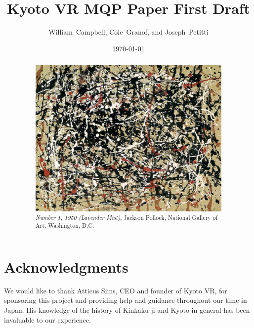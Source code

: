 \documentclass[a4paper, 10pt, american, titlepage]{article}
\title{Kyoto VR MQP Paper First Draft}
\author{William~Campbell, Cole~Granof, and Joseph~Petitti}
\date{\today}
\begin{document}


\maketitle

\begin{abstract}
\begin{figure}[h]
	\centering
	\includegraphics[width=\textwidth]{abstract.jpg}
	\caption[\textit{Number 1, 1950 (Lavender Mist)}, Jackson Pollock]
	{\textit{Number 1, 1950 (Lavender Mist)}, Jackson Pollock, National
		Gallery of Art, Washington, D.C.}
	\label{fig:abstract}
\end{figure}
\end{abstract}

\section*{Acknowledgments}
\label{sec:acknowledgements}

We would like to thank Atticus Sims, CEO and founder of Kyoto VR, for sponsoring
this project and providing help and guidance throughout our time in Japan. His
knowledge of the history of Kinkaku-ji and Kyoto in general has been invaluable
to our experience.
\end{document}
